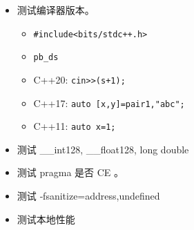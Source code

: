 \begin{itemize}
    \item 测试编译器版本。
    \begin{itemize}
        \item  \texttt{\#include<bits/stdc++.h>}
        \item  \texttt{pb\_ds}
        \item  C++20: \texttt{cin>>(s+1);}
        \item  C++17: \texttt{auto [x,y]=pair{1,"abc"};}
        \item  C++11: \texttt{auto x=1;}
    \end{itemize}
    \item 测试 \_\_int128, \_\_float128, long double
    \item 测试 pragma 是否 CE 。
    \item 测试 ‐fsanitize=address,undefined
    \item 测试本地性能
\end{itemize}



